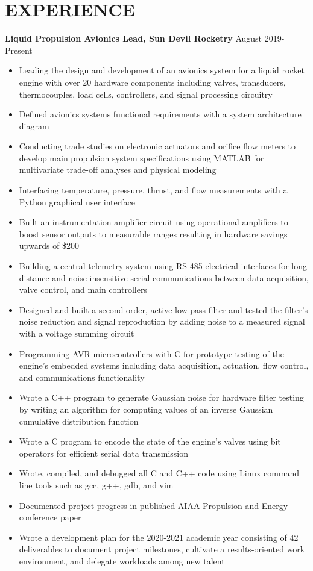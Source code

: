 \documentclass{article}
\begin{document}
\section{EXPERIENCE}
\textbf{Liquid Propulsion Avionics Lead, Sun Devil Rocketry}
\hfill
\vspace{0.5em}
August 2019-Present
\begin{itemize}
	\item{Leading the design and development of an avionics system for a liquid rocket engine with over 20 hardware components including valves, transducers, thermocouples, load cells, controllers, and signal processing circuitry}
	\item{Defined avionics systems functional requirements with a system architecture diagram}
	\item{Conducting trade studies on electronic actuators and orifice flow meters to develop main propulsion system specifications using MATLAB for multivariate trade-off analyses and physical modeling}
	\item{Interfacing temperature, pressure, thrust, and flow measurements with a Python graphical user interface}
	\item{Built an instrumentation amplifier circuit using operational amplifiers to boost sensor outputs to measurable ranges resulting in hardware savings upwards of \$200}
	\item{Building a central telemetry system using RS-485 electrical interfaces for long distance and noise insensitive serial communications between data acquisition, valve control, and main controllers}
	\item{Designed and built a second order, active low-pass filter and tested the filter's noise reduction and signal reproduction by adding noise to a measured signal with a voltage summing circuit}
	\item{Programming AVR microcontrollers with C for prototype testing of the engine's embedded systems including data acquisition, actuation, flow control, and communications functionality}
	\item{Wrote a C++ program to generate Gaussian noise for hardware filter testing by writing an algorithm for computing values of an inverse Gaussian cumulative distribution function}
	\item{Wrote a C program to encode the state of the engine's valves using bit operators for efficient serial data transmission}
	\item{Wrote, compiled, and debugged all C and C++ code using Linux command line tools such as gcc, g++, gdb, and vim}
	\item{Documented project progress in published AIAA Propulsion and Energy conference paper}
	\item{Wrote a development plan for the 2020-2021 academic year consisting of 42 deliverables to document project milestones, cultivate a results-oriented work environment, and delegate workloads among new talent}
\end{itemize}
\end{document}
